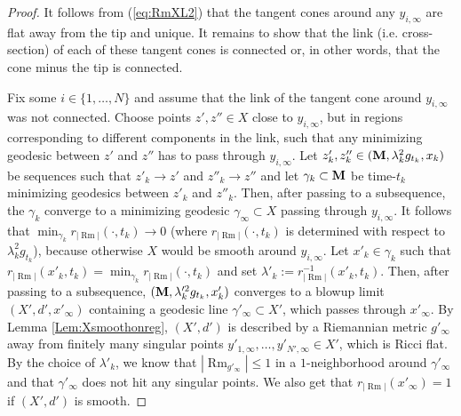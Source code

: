 \documentclass[11pt]{amsart}
\numberwithin{equation}{section}
\def\M{{\bf M}}
\DeclareMathOperator{\Rm}{Rm}
\newcommand{\rrm}{r_{|{\Rm}|}}
\numberwithin{equation}{section}
\begin{document}
\begin{proof}
It follows from (\ref{eq:RmXL2}) that the tangent cones around any $y_{i, \infty}$ are flat away from the tip and unique.
It remains to show that the link (i.e. cross-section) of each of these tangent cones is connected or, in other words, that the cone minus the tip is connected.

Fix some $i \in \{ 1, \ldots, N \}$ and assume that the link of the tangent cone around $y_{i, \infty}$ was not connected.
Choose points $z', z'' \in X$ close to $y_{i, \infty}$, but in regions corresponding to different components in the link, such that any minimizing geodesic between $z'$ and $z''$ has to pass through $y_{i, \infty}$.
Let $z'_k, z''_k \in (\M, \lambda_k^2 g_{t_k}, x_k)$ be sequences such that $z'_k \to z'$ and $z''_k \to z''$ and let $\gamma_k \subset \M$ be time-$t_k$ minimizing geodesics between $z'_k$ and $z''_k$.
Then, after passing to a subsequence, the $\gamma_k$ converge to a minimizing geodesic $\gamma_\infty \subset X$ passing through $y_{i, \infty}$.
It follows that $\min_{\gamma_k} \rrm (\cdot, t_k) \to 0$ (where $\rrm ( \cdot, t_k)$ is determined with respect to $\lambda_k^2 g_{t_k}$), because otherwise $X$ would be smooth around $y_{i, \infty}$.
Let $x'_k \in \gamma_k$ such that $\rrm (x'_k, t_k) = \min_{\gamma_k} \rrm (\cdot, t_k)$ and set $\lambda'_k := \rrm^{-1} (x'_k, t_k)$.
Then, after passing to a subsequence, $(\M, \lambda^{\prime 2}_k g_{t_k}, x'_k)$ converges to a blowup limit $(X', d', x'_\infty)$ containing a geodesic line $\gamma'_\infty \subset X'$, which passes through $x'_\infty$.
By Lemma \ref{Lem:Xsmoothonreg}, $(X', d')$ is described by a Riemannian metric $g'_\infty$ away from finitely many singular points $y'_{1, \infty}, \ldots, y'_{N', \infty} \in X'$, which is Ricci flat.
By the choice of $\lambda'_k$, we know that $|{\Rm}_{g'_\infty} | \leq 1$ in a $1$-neighborhood around $\gamma'_\infty$ and that $\gamma'_\infty$ does not hit any singular points.
We also get that $\rrm (x'_\infty) = 1$ if $(X', d')$ is smooth.


\end{proof}
\end{document}

